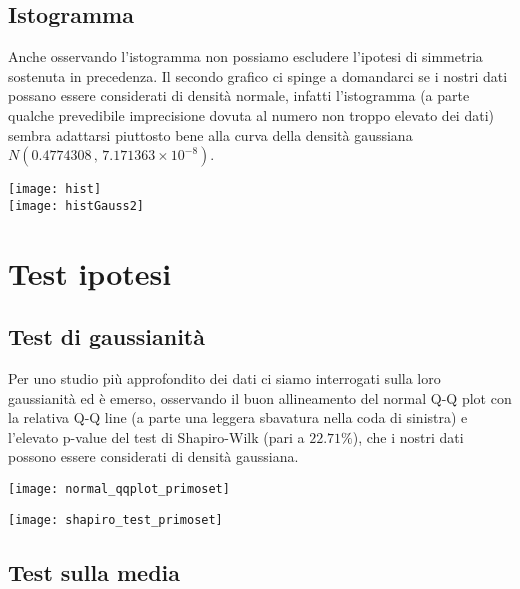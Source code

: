 \documentclass[a4paper]{article}
\begin{document}
	\subsection{Istogramma}
	\bigskip
	Anche osservando l'istogramma non possiamo escludere l'ipotesi di simmetria sostenuta in precedenza. Il secondo grafico ci spinge a domandarci se i nostri dati possano essere considerati di densità normale, infatti l'istogramma (a parte qualche prevedibile imprecisione dovuta al numero non troppo elevato dei dati) sembra adattarsi piuttosto bene alla curva della densità gaussiana  $N(0.4774308\,,\,7.171363\times 10^{-8})$.
\begin{center}
	
	\texttt{[image: hist]}  \\
 		\bigskip
 \medskip
 \smallskip
	\texttt{[image: histGauss2]} 
	
\end{center}
	




	
	\section{Test ipotesi}
	\medskip
		\subsection{Test di gaussianità}
		
	Per uno studio più approfondito dei dati ci siamo interrogati sulla loro gaussianità ed è emerso, osservando il buon allineamento del normal Q-Q plot con la relativa Q-Q line (a parte una leggera sbavatura nella coda di sinistra) e l'elevato p-value del test di Shapiro-Wilk (pari a $22.71\%$), che i nostri dati possono essere considerati di densità gaussiana.
	\label{gauss}
	\begin{center}
		\texttt{[image: normal\_qqplot\_primoset]} \\
		
		\bigskip
		\medskip
		\smallskip
		
		\texttt{[image: shapiro\_test\_primoset]}
	\end{center}

	\subsection{Test sulla media}
	
\end{document}
